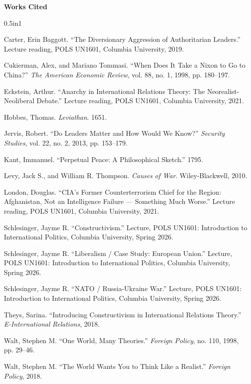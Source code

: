 \documentclass[12pt]{article}
\begin{document}
\newpage
\begin{center}
\textbf{Works Cited}
\end{center}

\begin{hangparas}{0.5in}{1}

Carter, Erin Baggott. ``The Diversionary Aggression of Authoritarian Leaders.'' Lecture reading, POLS UN1601, Columbia University, 2019.

Cukierman, Alex, and Mariano Tommasi. ``When Does It Take a Nixon to Go to China?'' \textit{The American Economic Review}, vol. 88, no. 1, 1998, pp. 180--197.

Eckstein, Arthur. ``Anarchy in International Relations Theory: The Neorealist-Neoliberal Debate.'' Lecture reading, POLS UN1601, Columbia University, 2021.

Hobbes, Thomas. \textit{Leviathan}. 1651.

Jervis, Robert. ``Do Leaders Matter and How Would We Know?'' \textit{Security Studies}, vol. 22, no. 2, 2013, pp. 153--179.

Kant, Immanuel. ``Perpetual Peace: A Philosophical Sketch.'' 1795.

Levy, Jack S., and William R. Thompson. \textit{Causes of War}. Wiley-Blackwell, 2010.

London, Douglas. ``CIA's Former Counterterrorism Chief for the Region: Afghanistan, Not an Intelligence Failure --- Something Much Worse.'' Lecture reading, POLS UN1601, Columbia University, 2021.

Schlesinger, Jayme R. ``Constructivism.'' Lecture, POLS UN1601: Introduction to International Politics, Columbia University, Spring 2026.

Schlesinger, Jayme R. ``Liberalism / Case Study: European Union.'' Lecture, POLS UN1601: Introduction to International Politics, Columbia University, Spring 2026.

Schlesinger, Jayme R. ``NATO / Russia-Ukraine War.'' Lecture, POLS UN1601: Introduction to International Politics, Columbia University, Spring 2026.

Theys, Sarina. ``Introducing Constructivism in International Relations Theory.'' \textit{E-International Relations}, 2018.

Walt, Stephen M. ``One World, Many Theories.'' \textit{Foreign Policy}, no. 110, 1998, pp. 29--46.

Walt, Stephen M. ``The World Wants You to Think Like a Realist.'' \textit{Foreign Policy}, 2018.

\end{hangparas}
\end{document}
